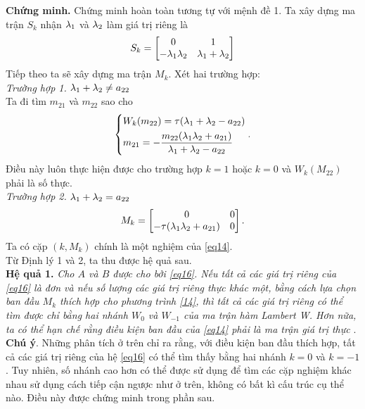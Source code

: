 \noindent\textbf{Chứng minh.} Chứng minh hoàn toàn tương tự với mệnh đề 1. Ta xây dựng ma trận $S_k$ nhận $\lambda_1$ và $\lambda_2$ làm giá trị riêng là
\begin{equation}\label{eq32}
	S_k =\begin{bmatrix}
		0 & 1\\ 
		- \lambda_1 \lambda_2 & \lambda_1 + \lambda_2
	\end{bmatrix}
\end{equation}
Tiếp theo ta sẽ xây dựng ma trận $M_k$. Xét hai trường hợp:\\
\noindent\textit{Trường hợp 1.} $\lambda_1 + \lambda_2 \ne a_{22}$\\
Ta đi tìm $m_{21}$ và $m_{22}$ sao cho
\begin{equation*}
	\left\{\begin{aligned}
		&W_k(m_{22}) = \tau (\lambda_1 + \lambda_2 -a_{22})\\ 
		&m_{21} = - \dfrac{m_{22}(\lambda_1 \lambda_2+a_{21})}{\lambda_1  + \lambda_2 - a_{22}}
	\end{aligned}\right. . 
\end{equation*}
Điều này luôn thực hiện được cho trường hợp $k =1$ hoặc $k =0$ và $W_k(M_{22})$ phải là số thực. \\
\noindent\textit{Trường hợp 2.} $\lambda_1 + \lambda_2 = a_{22}$
\begin{equation*}
	M_k = \begin{bmatrix}
		0 & 0\\
		-\tau (\lambda_1 \lambda_2 +a_{21}) & 0
	\end{bmatrix}.
\end{equation*}
Ta có cặp $(k, M_k)$ chính là một nghiệm của \eqref{eq14}.\\
Từ Định lý 1 và 2, ta thu được hệ quả sau.\\ 

\noindent\textbf{Hệ quả 1.} \textit{Cho $A$ và $B$ được cho bởi \eqref{eq16}. Nếu tất cả các giá trị riêng của \eqref{eq16} là đơn và  nếu số lượng các giá trị riêng thực khác một, bằng cách lựa chọn ban đầu $M_k$ thích hợp cho phương trình \eqref{14},  thì tất cả các giá trị riêng có thể tìm được chỉ bằng hai nhánh $W_0$ và $W_{-1}$ của ma trận hàm Lambert W. Hơn nữa, ta có thể hạn chế rằng điều kiện ban đầu của \eqref{eq14} phải là ma trận giá trị thực} .\\

\noindent\textbf{Chú ý}. Những phân tích ở trên chỉ ra rằng, với điều kiện ban đầu thích hợp, tất cả các giá trị riêng của hệ \eqref{eq16} có thể tìm thấy bằng hai nhánh $k =0$ và $k = -1$. Tuy nhiên, số nhánh cao hơn có thể được sử dụng để tìm các cặp nghiệm khác nhau sử dụng cách tiếp cận ngược như ở trên, không có bất kì cấu trúc cụ thể nào. Điều này được chứng minh trong phần sau.

